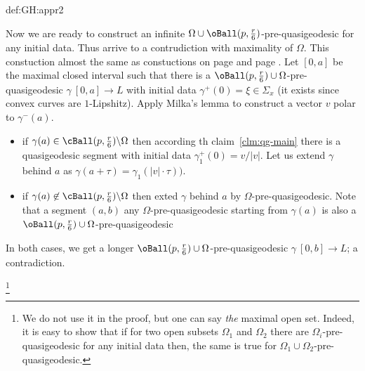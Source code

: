 {\begin{subthm}{def:GH:appr2}
\smallskip















Now we are ready to construct an infinite $\Omega\cup\oBall(p,\tfrac r6)$-pre-quasigeodesic for any initial data.
Thus arrive to a contrudiction with maximality of $\Omega$.
This constuction almost the same as constuctions on page \pageref{transfinite-extension-page} and page \pageref{transfinite-extension-2-page}.
Let $[0,a]$ be the maximal closed interval 
such that there is a $\oBall(p,\tfrac r6)\cup\Omega$-pre-quasigeodesic $\gamma\:[0,a]\to L$ with initial data $\gamma^+(0)=\xi\in\Sigma_x$ (it exists since convex curves are $1$-Lipshitz).
Apply Milka's lemma to construct a vector $v$ polar to $\gamma^-(a)$.
\begin{itemize}
\item if $\gamma(a)\in\cBall(p,\tfrac r6)\backslash\Omega$ then according th claim~\ref{clm:qg-main} there is a quasigeodesic segment with initial data $\gamma_1^+(0)=v/|v|$.
Let us extend $\gamma$ behind $a$ as $\gamma(a+\tau)=\gamma_1({|v|}\cdot\tau))$.
\item if $\gamma(a)\not\in\cBall(p,\tfrac r6)\backslash\Omega$
then exted $\gamma$ behind $a$ by $\Omega$-pre-quasigeodesic.
Note that a segment $(a,b)$ any $\Omega$-pre-quasigeodesic starting from $\gamma(a)$ is also a $\oBall(p,\tfrac r6)\cup\Omega$-pre-quasigeodesic
\end{itemize}
In both cases, we get a longer $\oBall(p,\tfrac r6)\cup\Omega$-pre-quasigeodesic $\gamma\:[0,b]\to L$; a contradiction.\qeds










\footnote{We do not use it in the proof, but one can say \emph{the} maximal open set.
Indeed, it is easy to show that if for two open subsets $\Omega_1$ and $\Omega_2$ there are $\Omega_i$-pre-quasigeodesic for any initial data then,  the same is true for $\Omega_1\cup\Omega_2$-pre-quasigeodesic.}
















\end{subthm}}
